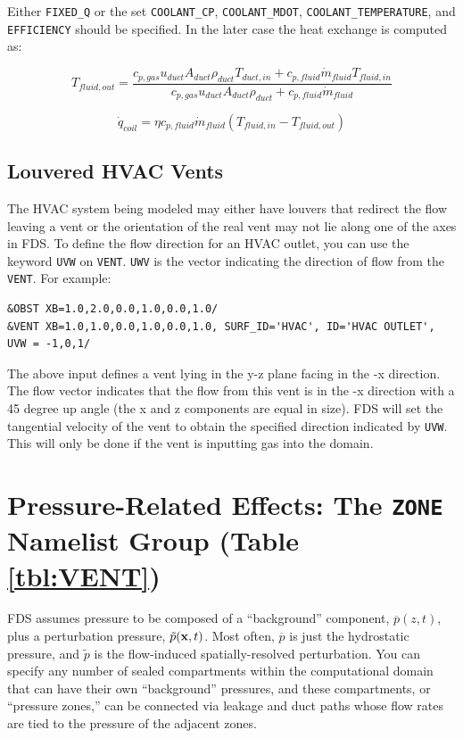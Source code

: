 \documentclass[11pt]{book}
\newcommand{\ct}{\tt\small}
\newcommand{\bx}{{\bf x}}
\newcommand{\tp}{\tilde{p}}
\newcommand{\bp}{\overline{p}}
\newcommand{\dq}{\dot{q}}
\newcommand{\dm}{\dot{m}}
\newcommand{\be}{\begin{equation}}
\newcommand{\ee}{\end{equation}}
\begin{document}
Either {\ct FIXED\_Q} or the set {\ct COOLANT\_CP}, {\ct COOLANT\_MDOT}, {\ct COOLANT\_TEMPERATURE}, and {\ct EFFICIENCY} should be specified.  In the later case the heat exchange is computed as:

\be T_{fluid,out}=\frac{c_{p,gas} u_{duct} A_{duct} \rho_{duct} T_{duct,in} + c_{p,fluid} \dm_{fluid} T_{fluid,in}}{c_{p,gas} u_{duct} A_{duct} \rho_{duct} + c_{p,fluid} \dm_{fluid}}
\ee

\be \dq_{coil}=\eta  c_{p,fluid} \dm_{fluid} \left( T_{fluid,in} - T_{fluid,out} \right)
\ee

\subsection{Louvered HVAC Vents}
\label{info:HVAClouvers}

The HVAC system being modeled may either have louvers that redirect the flow leaving a vent or the orientation of the real vent may not lie along one of the axes in FDS.  To define the flow direction for an HVAC outlet, you can use the keyword {\ct UVW} on {\ct VENT}.  {\ct UWV} is the vector indicating the direction of flow from the {\ct VENT}.  For example:

\footnotesize
\begin{verbatim}
&OBST XB=1.0,2.0,0.0,1.0,0.0,1.0/
&VENT XB=1.0,1.0,0.0,1.0,0.0,1.0, SURF_ID='HVAC', ID='HVAC OUTLET', UVW = -1,0,1/
\end{verbatim}\normalsize

The above input defines a vent lying in the y-z plane facing in the -x direction.  The flow vector indicates that the flow from this vent is in the -x direction with a 45 degree up angle (the x and z components are equal in size).  FDS will set the tangential velocity of the vent to obtain the specified direction indicated by {\ct UVW}.  This will only be done if the vent is inputting gas into the domain.

\section{Pressure-Related Effects: The \texorpdfstring{{\tt ZONE}}{ZONE} Namelist Group (Table \ref{tbl:VENT})}
\label{info:ZONE}

FDS assumes pressure to be composed of a ``background'' component, $\bp(z,t)$, plus a perturbation pressure, $\tp(\bx,t)$. Most
often, $\bp$ is just the hydrostatic pressure, and $\tp$ is the flow-induced spatially-resolved perturbation.
You can specify any number of sealed compartments within the computational
domain that can have their own ``background'' pressures, and these compartments, or ``pressure zones,'' can be connected via leakage and duct paths whose
flow rates are tied to the pressure of the adjacent zones.
\end{document}
